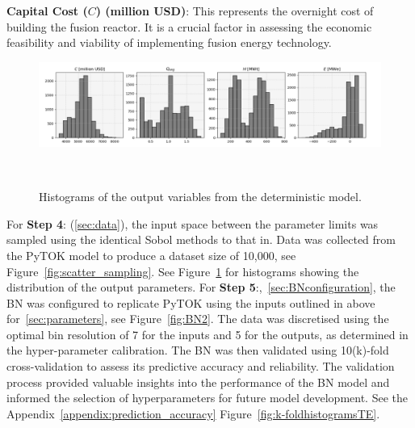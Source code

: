 \documentclass[journal]{IEEEtran}
\begin{document}
\textbf{Capital Cost ($C$) (million USD)}: This represents the overnight cost of building the fusion reactor. It is a crucial factor in assessing the economic feasibility and viability of implementing fusion energy technology. 

\begin{figure}[t]
    \centering
    \includegraphics[width=\columnwidth]{figures/methodology/output_distributions.png}
    \caption{\small Histograms of the output variables from the deterministic model.}~\label{fig:outputs_marchdata}
\end{figure}

For \textbf{Step 4}: (\ref{sec:data}), the input space between the parameter limits was sampled using the identical Sobol methods to that in\cite{Griffiths2024}. Data was collected from the PyTOK model to produce a dataset size of 10,000, see Figure~\ref{fig:scatter_sampling}. See Figure~\ref{fig:outputs_marchdata} for histograms showing the distribution of the output parameters. For \textbf{Step 5}:,~\ref{sec:BNconfiguration}, the BN was configured to replicate PyTOK using the inputs outlined in above for~\ref{sec:parameters}, see Figure~\ref{fig:BN2}. The data was discretised using the optimal bin resolution of 7 for the inputs and 5 for the outputs, as determined in the hyper-parameter calibration. The BN was then validated using 10(k)-fold cross-validation to assess its predictive accuracy and reliability. The validation process provided valuable insights into the performance of the BN model and informed the selection of hyperparameters for future model development. See the Appendix~\ref{appendix:prediction_accuracy} Figure~\ref{fig:k-foldhistogramsTE}.
\end{document}
